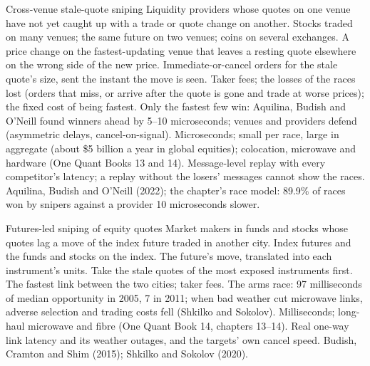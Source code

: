 \begin{strategyfile}{Cross-venue stale-quote sniping}\label{strat:hf:latency-arbitrage-and-its-defence:snipe}
 Liquidity providers whose quotes on one venue have not yet caught up with a trade or quote change on another.
 Stocks traded on many venues; the same future on two venues; coins on several exchanges.
 A price change on the fastest-updating venue that leaves a resting quote elsewhere on the wrong side of the new price.
 Immediate-or-cancel orders for the stale quote's size, sent the instant the move is seen.
 Taker fees; the losses of the races lost (orders that miss, or arrive after the quote is gone and trade at worse prices); the fixed
cost of being fastest.
 Only the fastest few win: Aquilina, Budish and O'Neill found winners ahead by 5--10 microseconds; venues and providers defend
(asymmetric delays, cancel-on-signal).
 Microseconds; small per race, large in aggregate (about \$5 billion a year in global equities); colocation,
microwave and hardware (One Quant Books 13 and 14).
 Message-level replay with every competitor's latency; a replay without the losers' messages cannot show the races.
 Aquilina, Budish and O'Neill (2022); the chapter's race model: 89.9\% of races won by snipers against a provider 10 microseconds
slower.
\end{strategyfile}

\begin{strategyfile}{Futures-led sniping of equity quotes}\label{strat:hf:latency-arbitrage-and-its-defence:futures}
 Market makers in funds and stocks whose quotes lag a move of the index future traded in another city.
 Index futures and the funds and stocks on the index.
 The future's move, translated into each instrument's units.
 Take the stale quotes of the most exposed instruments first.
 The fastest link between the two cities; taker fees.
 The arms race: 97 milliseconds of median opportunity in 2005, 7 in 2011; when bad weather cut microwave links, adverse selection
and trading costs fell (Shkilko and Sokolov).
 Milliseconds; long-haul microwave and fibre (One Quant Book 14, chapters 13--14).
 Real one-way link latency and its weather outages, and the targets' own cancel speed.
 Budish, Cramton and Shim (2015); Shkilko and Sokolov (2020).
\end{strategyfile}

